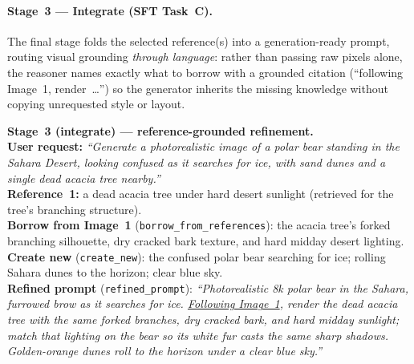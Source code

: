 \paragraph{Stage~3 --- Integrate (SFT Task~C).}
The final stage folds the selected reference(s) into a generation-ready prompt, routing
visual grounding \emph{through language}: rather than passing raw pixels alone, the
reasoner names exactly what to borrow with a grounded citation (``following Image~1,
render~\dots'') so the generator inherits the missing knowledge without copying
unrequested style or layout.

\begin{examplebox}
\small
\textbf{Stage~3 (integrate) --- reference-grounded refinement.}\\[2pt]
\textbf{User request:} \emph{``Generate a photorealistic image of a polar bear standing in the Sahara Desert, looking confused as it searches for ice, with sand dunes and a single dead acacia tree nearby.''}\\[2pt]
\textbf{Reference~1:} a dead acacia tree under hard desert sunlight (retrieved for the tree's branching structure).\\[3pt]
\textbf{Borrow from Image~1} (\texttt{borrow\_from\_references}): the acacia tree's forked branching silhouette, dry cracked bark texture, and hard midday desert lighting.\\[2pt]
\textbf{Create new} (\texttt{create\_new}): the confused polar bear searching for ice; rolling Sahara dunes to the horizon; clear blue sky.\\[2pt]
\textbf{Refined prompt} (\texttt{refined\_prompt}): \emph{``Photorealistic 8k polar bear in the Sahara, furrowed brow as it searches for ice. \underline{Following Image~1}, render the dead acacia tree with the same forked branches, dry cracked bark, and hard midday sunlight; match that lighting on the bear so its white fur casts the same sharp shadows. Golden-orange dunes roll to the horizon under a clear blue sky.''}
\end{examplebox}
